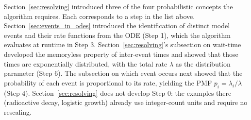 

Section~\ref{sec:resolving} introduced three of the four probabilistic concepts the algorithm requires. Each corresponds to a step in the list above. Section~\ref{sec:events_in_odes} introduced the identification of distinct model events and their rate functions from the ODE (Step 1), which the algorithm evaluates at runtime in Step 3. Section~\ref{sec:resolving}'s subsection on wait-time developed the memoryless property of inter-event times and showed that those times are exponentially distributed, with the total rate $\lambda$ as the distribution parameter (Step 6). The subsection on which event occurs next showed that the probability of each event is proportional to its rate, yielding the PMF $p_i = \lambda_i/\lambda$ (Step 4). Section~\ref{sec:resolving} does not develop Step 0: the examples there (radioactive decay, logistic growth) already use integer-count units and require no rescaling.

\FloatBarrier







